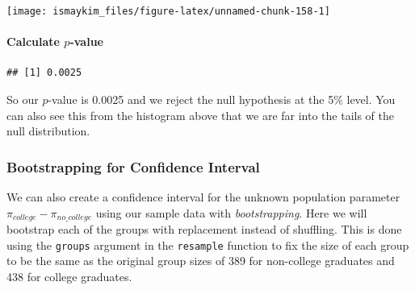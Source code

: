 \documentclass[]{tufte-book}
\newenvironment{Shaded}{\begin{snugshade}}{\end{snugshade}}
\newcommand{\KeywordTok}[1]{\textcolor[rgb]{0.13,0.29,0.53}{\textbf{{#1}}}}
\newcommand{\DataTypeTok}[1]{\textcolor[rgb]{0.13,0.29,0.53}{{#1}}}
\newcommand{\DecValTok}[1]{\textcolor[rgb]{0.00,0.00,0.81}{{#1}}}
\newcommand{\StringTok}[1]{\textcolor[rgb]{0.31,0.60,0.02}{{#1}}}
\newcommand{\OtherTok}[1]{\textcolor[rgb]{0.56,0.35,0.01}{{#1}}}
\newcommand{\NormalTok}[1]{{#1}}
\begin{document}
\begin{center}\texttt{[image: ismaykim\_files/figure-latex/unnamed-chunk-158-1]} \end{center}

\paragraph{\texorpdfstring{Calculate
\(p\)-value}{Calculate p-value}}\label{calculate-p-value-2}

\begin{Shaded}
\end{Shaded}

\begin{verbatim}
## [1] 0.0025
\end{verbatim}

So our \(p\)-value is 0.0025 and we reject the null hypothesis at the
5\% level. You can also see this from the histogram above that we are
far into the tails of the null distribution.

\subsubsection{Bootstrapping for Confidence
Interval}\label{bootstrapping-for-confidence-interval-2}

We can also create a confidence interval for the unknown population
parameter \(\pi_{college} - \pi_{no\_college}\) using our sample data
with \emph{bootstrapping}. Here we will bootstrap each of the groups
with replacement instead of shuffling. This is done using the
\texttt{groups} argument in the \texttt{resample} function to fix the
size of each group to be the same as the original group sizes of 389 for
non-college graduates and 438 for college graduates.

\begin{Shaded}
\end{Shaded}
\end{document}
